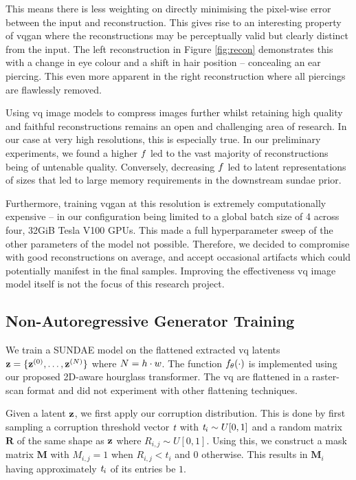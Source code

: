 This means there is less weighting on
directly minimising the pixel-wise error between the input and reconstruction.
This gives rise to an interesting property of \gls{vqgan} where the
reconstructions may be perceptually valid but clearly distinct from the input.
The left reconstruction in Figure \ref{fig:recon} demonstrates this with a
change in eye colour and a shift in hair position -- concealing an ear piercing.
This even more apparent in the right reconstruction where all piercings are
flawlessly removed.

Using \gls{vq} image models to compress images further whilst retaining high
quality and faithful reconstructions remains an open and challenging area of
research. In our case at very high resolutions, this is especially true. In our
preliminary experiments, we found a higher $f$ led to the vast
majority of reconstructions being of untenable quality. Conversely, decreasing
$f$ led to latent representations of sizes that led to large
memory requirements in the downstream \gls{sundae} prior. 

Furthermore, training \gls{vqgan} at this resolution is extremely
computationally expensive -- in our configuration being limited to a global
batch size of 4 across four, 32GiB Tesla V100 GPUs. This made a full
hyperparameter sweep of the other parameters of the model not possible.
Therefore, we decided to compromise with good reconstructions on average, and
accept occasional artifacts which could potentially manifest in the final
samples. Improving the effectiveness \gls{vq} image model itself is not the
focus of this research project.

\subsection{Non-Autoregressive Generator Training}

We train a SUNDAE model on the flattened extracted \gls{vq} latents $\mathbf{z} =
\{\mathbf{z}^{(0)}, \dots, \mathbf{z}^{(N)}\}$ where $N = h \cdot w$.
The function $f_\theta(\cdot)$ is implemented using our proposed 2D-aware
hourglass transformer. The \gls{vq} are flattened in a raster-scan format and
did not experiment with other flattening techniques.

Given a latent $\mathbf{z}$, we first apply our corruption distribution. This is
done by first sampling a corruption threshold vector $\textit{t}$ with
$\textit{t}_i \sim U[0, 1]$ and a random matrix $\mathbf{R}$ of the
same shape as $\mathbf{z}$ where $R_{i,j} \sim U[0,1]$. Using this, we construct a
mask matrix $\mathbf{M}$ with $M_{i,j} = 1$ when $R_{i,j} < t_i$ and $0$
otherwise. This results in $\mathbf{M}_i$ having approximately
$\textit{t}_i$ of its entries be $1$.

